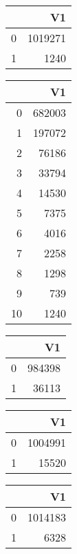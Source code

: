 \bigskip\bigskip
\centering
\begin{tabular}{rr}
  \hline
 & V1 \\ 
  \hline
0 & 1019271 \\ 
  1 & 1240 \\ 
   \hline
\end{tabular}

\bigskip\bigskip
\centering
\begin{tabular}{rr}
  \hline
 & V1 \\ 
  \hline
0 & 682003 \\ 
  1 & 197072 \\ 
  2 & 76186 \\ 
  3 & 33794 \\ 
  4 & 14530 \\ 
  5 & 7375 \\ 
  6 & 4016 \\ 
  7 & 2258 \\ 
  8 & 1298 \\ 
  9 & 739 \\ 
  10 & 1240 \\ 
   \hline
\end{tabular}

\bigskip\bigskip
\centering
\begin{tabular}{rr}
  \hline
 & V1 \\ 
  \hline
0 & 984398 \\ 
  1 & 36113 \\ 
   \hline
\end{tabular}

\bigskip\bigskip
\centering
\begin{tabular}{rr}
  \hline
 & V1 \\ 
  \hline
0 & 1004991 \\ 
  1 & 15520 \\ 
   \hline
\end{tabular}

\bigskip\bigskip
\centering
\begin{tabular}{rr}
  \hline
 & V1 \\ 
  \hline
0 & 1014183 \\ 
  1 & 6328 \\ 
   \hline
\end{tabular}

